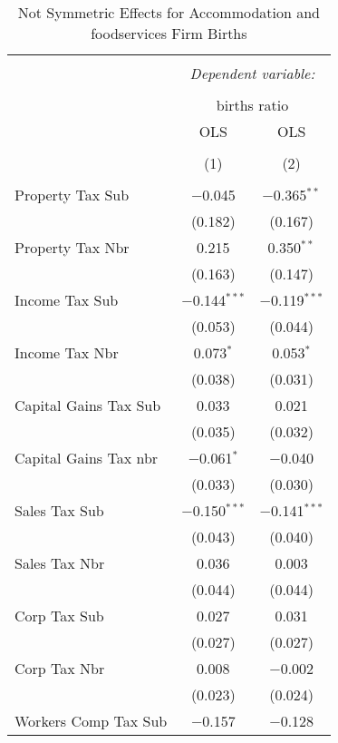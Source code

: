 
\begin{table}[!htbp] \centering 
  \caption{Not Symmetric Effects for  Accommodation and foodservices Firm Births} 
  \label{72noequality} 
\footnotesize 
\begin{tabular}{@{\extracolsep{5pt}}lcc} 
\\[-1.8ex]\hline 
\hline \\[-1.8ex] 
 & \multicolumn{2}{c}{\textit{Dependent variable:}} \\ 
\cline{2-3} 
\\[-1.8ex] & \multicolumn{2}{c}{births ratio} \\ 
 & OLS & OLS \\ 
\\[-1.8ex] & (1) & (2)\\ 
\hline \\[-1.8ex] 
 Property Tax Sub & $-$0.045 & $-$0.365$^{**}$ \\ 
  & (0.182) & (0.167) \\ 
  Property Tax Nbr & 0.215 & 0.350$^{**}$ \\ 
  & (0.163) & (0.147) \\ 
  Income Tax Sub & $-$0.144$^{***}$ & $-$0.119$^{***}$ \\ 
  & (0.053) & (0.044) \\ 
  Income Tax Nbr & 0.073$^{*}$ & 0.053$^{*}$ \\ 
  & (0.038) & (0.031) \\ 
  Capital Gains Tax Sub & 0.033 & 0.021 \\ 
  & (0.035) & (0.032) \\ 
  Capital Gains Tax nbr & $-$0.061$^{*}$ & $-$0.040 \\ 
  & (0.033) & (0.030) \\ 
  Sales Tax Sub & $-$0.150$^{***}$ & $-$0.141$^{***}$ \\ 
  & (0.043) & (0.040) \\ 
  Sales Tax Nbr & 0.036 & 0.003 \\ 
  & (0.044) & (0.044) \\ 
  Corp Tax Sub & 0.027 & 0.031 \\ 
  & (0.027) & (0.027) \\ 
  Corp Tax Nbr & 0.008 & $-$0.002 \\ 
  & (0.023) & (0.024) \\ 
  Workers Comp Tax Sub & $-$0.157 & $-$0.128 \\ 

\end{tabular}
\end{table}
